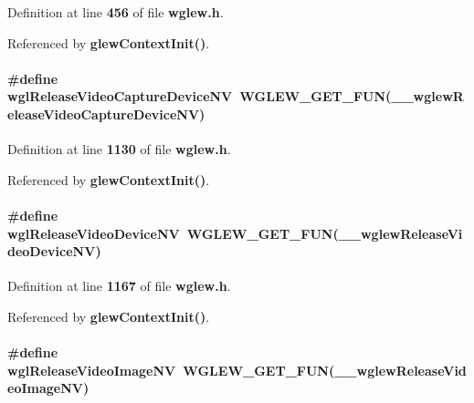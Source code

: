 Definition at line {\bf 456} of file {\bf wglew.\+h}.



Referenced by {\bf glew\+Context\+Init()}.

\paragraph[{wgl\+Release\+Video\+Capture\+Device\+NV}]{\setlength{\rightskip}{0pt plus 5cm}\#define wgl\+Release\+Video\+Capture\+Device\+NV~{\bf W\+G\+L\+E\+W\+\_\+\+G\+E\+T\+\_\+\+F\+UN}({\bf \+\_\+\+\_\+wglew\+Release\+Video\+Capture\+Device\+NV})}\label{wglew_8h_a6cdab025a50002ea60258b0a71d41f2c}


Definition at line {\bf 1130} of file {\bf wglew.\+h}.



Referenced by {\bf glew\+Context\+Init()}.

\paragraph[{wgl\+Release\+Video\+Device\+NV}]{\setlength{\rightskip}{0pt plus 5cm}\#define wgl\+Release\+Video\+Device\+NV~{\bf W\+G\+L\+E\+W\+\_\+\+G\+E\+T\+\_\+\+F\+UN}({\bf \+\_\+\+\_\+wglew\+Release\+Video\+Device\+NV})}\label{wglew_8h_aed5bc930d6ddd2969098547cf792617b}


Definition at line {\bf 1167} of file {\bf wglew.\+h}.



Referenced by {\bf glew\+Context\+Init()}.

\paragraph[{wgl\+Release\+Video\+Image\+NV}]{\setlength{\rightskip}{0pt plus 5cm}\#define wgl\+Release\+Video\+Image\+NV~{\bf W\+G\+L\+E\+W\+\_\+\+G\+E\+T\+\_\+\+F\+UN}({\bf \+\_\+\+\_\+wglew\+Release\+Video\+Image\+NV})}\label{wglew_8h_a8c361d50b75f4a1de008f8a2b4461467}


